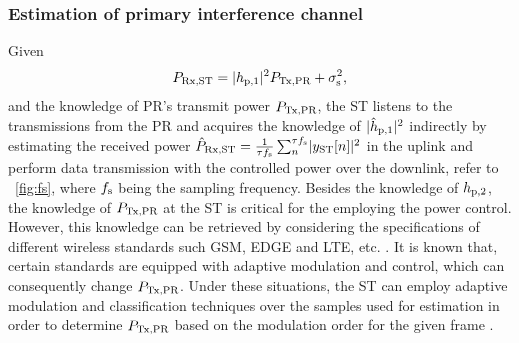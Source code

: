 \subsubsection{Estimation of primary interference channel}
Given 
\begin{equation}
P_{\text{Rx,ST}} = |h_{\text{p,1}}|^2 P_{\text{Tx,PR}} + \sigma^2_{\text{s}} \label{eq:prcvd}, 
\end{equation}
and the knowledge of PR's transmit power $P_{\text{Tx,PR}}$, the ST listens to the transmissions from the PR and acquires the knowledge of $|\hat{h}_{\text{p,1}}|^2$ indirectly by estimating the received power $\hat{P}_{\text{Rx,ST}} = {\frac{1}{{\tau f_{\text{s}}}}\sum_n^{\tau f_{\text{s}}}} { |y_{\text{ST}}[n]|^2}$ in the uplink and perform data transmission with the controlled power over the downlink, refer to \figurename~\ref{fig:fs}, where $f_{\text{s}}$ being the sampling frequency. Besides the knowledge of $h_{\text{p,2}}$, the knowledge of $P_{\text{Tx,PR}}$ at the ST is critical for the employing the power control. However, this knowledge can be retrieved by considering the specifications of different wireless standards such GSM, EDGE and LTE, etc. \cite{Sharma14}. It is known that, certain standards are equipped with adaptive modulation and control, which can consequently change $P_{\text{Tx,PR}}$. Under these situations, the ST can employ adaptive modulation and classification techniques over the samples used for estimation in order to determine $P_{\text{Tx,PR}}$ based on the modulation order for the given frame \cite{Tsak14_}. 

